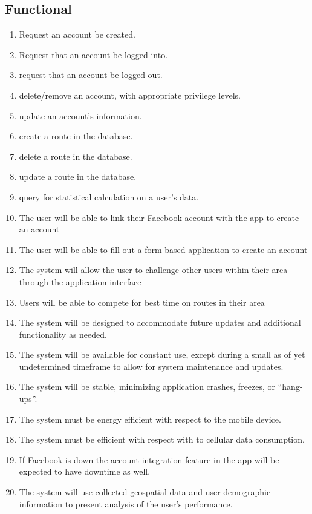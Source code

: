 \documentclass{article}
\begin{document}
\subsection{Functional}
\begin{enumerate}
    \item Request an account be created.
    \item Request that an account be logged into.
    \item request that an account be logged out.
    \item delete/remove an account, with appropriate privilege levels.
    \item update an account's information.
    \item create a route in the database.
    \item delete a route in the database.
    \item update a route in the database.
    \item query for statistical calculation on a user's data.
    \item The user will be able to link their Facebook account with the app to create an account
    \item The user will be able to fill out a form based application to create an account
    \item The system will allow the user to challenge other users within their area through the application interface
    \item Users will be able to compete for best time on routes in their area
    \item The system will be designed to accommodate future updates and additional functionality as needed.
    \item The system will be available for constant use, except during a small as of yet undetermined timeframe to allow for system maintenance and updates.
    \item The system will be stable, minimizing application crashes, freezes, or “hang-ups”.
    \item The system must be energy efficient with respect to the mobile device.
    \item The system must be efficient with respect with to cellular data consumption.
    \item If Facebook is down the account integration feature in the app will be expected to have downtime as well.
    \item The system will use collected geospatial data and user demographic information to present analysis of the user’s performance.

\end{enumerate}
\end{document}
